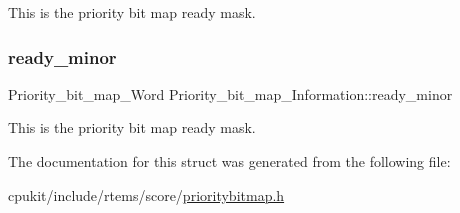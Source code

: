 This is the priority bit map ready mask. \mbox{\label{structPriority__bit__map__Information_ab9a78b5deb7f2e30cb7f8b127eca291b}} 
\subsubsection{\texorpdfstring{ready\_minor}{ready\_minor}}
{\footnotesize\ttfamily Priority\+\_\+bit\+\_\+map\+\_\+\+Word Priority\+\_\+bit\+\_\+map\+\_\+\+Information\+::ready\+\_\+minor}

This is the priority bit map ready mask. 

The documentation for this struct was generated from the following file\+:\begin{DoxyCompactItemize}
\item 
cpukit/include/rtems/score/\mbox{\hyperlink{prioritybitmap_8h}{prioritybitmap.\+h}}\end{DoxyCompactItemize}

